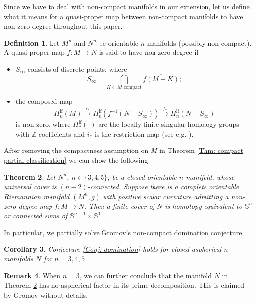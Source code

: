 \documentclass[11pt,letterpaper]{amsart}
\numberwithin{equation}{section}
\newtheorem{theorem}{Theorem}[section]
\newtheorem{corollary}[theorem]{Corollary}
\theoremstyle{definition}
\newtheorem{definition}[theorem]{Definition}
\newtheorem{remark}[theorem]{Remark}
\begin{document}
Since we have to deal with non-compact manifolds in our extension, let us define what it means for a quasi-proper map between non-compact manifolds to have non-zero degree throughout this paper.
\begin{definition}\label{Defn: degree}
	Let $M^{n}$ and $N^{n}$ be orientable $n$-manifolds (possibly non-compact). A quasi-proper map $f:M\to N$ is said to have non-zero degree if
	\begin{itemize}\setlength{\itemsep}{1mm}
	
	\item $S_\infty$ consists of discrete points, where
 $$S_\infty=\bigcap_{K\subset M \text{ compact}} \overline{f(M-K)};$$
	\item the composed map
	$$H_n^{\mathrm{lf}}(M)\xrightarrow{i_*} H_n^{\mathrm{lf}}(f^{-1}(N-S_\infty))\xrightarrow{f_*} H_n^{\mathrm{lf}}(N-S_\infty)$$
	is non-zero, where $H_{\ast}^{\mathrm{lf}}(\cdot)$ are the locally-finite singular homology groups {with $\mathbb{Z}$ coefficients} and $i_{*}$ is the restriction map (see e.g. \cite[Lecture 6, Section 1.3]{Mor18}).
\end{itemize}
\end{definition}
After removing the compactness assumption on $M$ in Theorem \ref{Thm: compact partial classification} we can show the following
\begin{theorem}\label{Thm: partial classification}
    Let $N^n$, $n\in\{3,4,5\}$, be a closed orientable $n$-manifold, whose universal cover is $(n-2)$-connected. Suppose there is a complete orientable Riemannian manifold $(M^n,g)$ with positive scalar curvature admitting a non-zero degree map $f:M\to N$. Then a finite cover of $N$ is homotopy equivalent to $\mathbb{S}^n$ or connected sums
of $\mathbb{S}^{n-1} \times \mathbb{S}^1$.
\end{theorem}
In particular, we partially solve Gromov's non-compact domination conjecture.
\begin{corollary}
Conjecture \ref{Conj: domination} holds for closed aspherical $n$-manifolds $N$ for $n=3,4,5$.
\end{corollary}

\begin{remark}
When $n=3$, we can further conclude that the manifold $N$ in Theorem \ref{Thm: partial classification} has no aspherical factor in its prime decomposition. This is claimed by Gromov \cite[p. 140]{Gro19} without details.
\end{remark}
\end{document}
